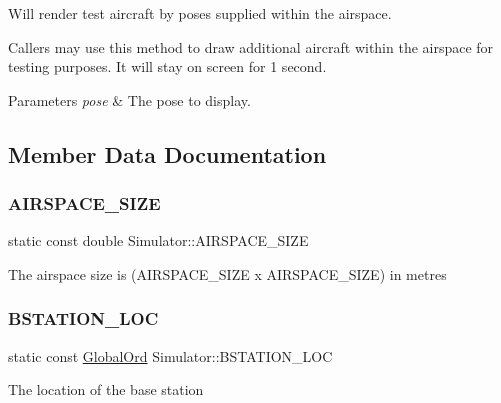 Will render test aircraft by poses supplied within the airspace. 

Callers may use this method to draw additional aircraft within the airspace for testing purposes. It will stay on screen for 1 second.


\begin{DoxyParams}{Parameters}
{\em pose} & The pose to display. \\
\hline
\end{DoxyParams}


\subsection{Member Data Documentation}
\mbox{\label{classSimulator_a5f06c727e635ea9229cb12f662d05036}} 
\subsubsection{\texorpdfstring{A\+I\+R\+S\+P\+A\+C\+E\+\_\+\+S\+I\+ZE}{AIRSPACE\_SIZE}}
{\footnotesize\ttfamily static const double Simulator\+::\+A\+I\+R\+S\+P\+A\+C\+E\+\_\+\+S\+I\+ZE\hspace{0.3cm}{\ttfamily [static]}}

The airspace size is (A\+I\+R\+S\+P\+A\+C\+E\+\_\+\+S\+I\+ZE x A\+I\+R\+S\+P\+A\+C\+E\+\_\+\+S\+I\+ZE) in metres \mbox{\label{classSimulator_a21f23eb0363ffc0a9cc438e0249f8968}} 
\subsubsection{\texorpdfstring{B\+S\+T\+A\+T\+I\+O\+N\+\_\+\+L\+OC}{BSTATION\_LOC}}
{\footnotesize\ttfamily static const \hyperlink{structGlobalOrd}{Global\+Ord} Simulator\+::\+B\+S\+T\+A\+T\+I\+O\+N\+\_\+\+L\+OC\hspace{0.3cm}{\ttfamily [static]}}

The location of the base station \mbox{\label{classSimulator_a4ecdf564a4773968f2c2acc4f9bad29f}} 
